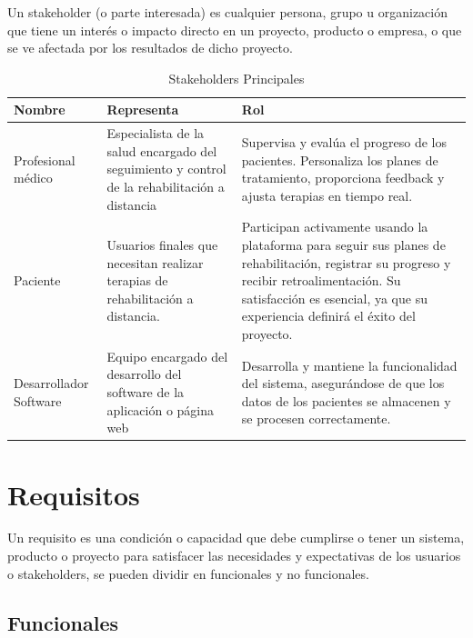 \documentclass{article}
\begin{document}
	Un stakeholder (o parte interesada) es cualquier persona, grupo u organización que tiene un interés o impacto directo en un proyecto, producto o empresa, o que se ve afectada por los resultados de dicho proyecto. 
	
	\begin{table}[ht]
		\centering
		\caption{Stakeholders Principales}
		\begin{tabular}{@{} p{3cm} p{6cm} p{7cm} @{}}
			\toprule
			\textbf{Nombre} & \textbf{Representa} & \textbf{Rol} \\
			\midrule
			Profesional médico & 
			Especialista de la salud encargado del seguimiento y control de la rehabilitación a distancia & 
			Supervisa y evalúa el progreso de los pacientes. \newline Personaliza los planes de tratamiento, proporciona feedback y ajusta terapias en tiempo real. \\
			
			\addlinespace
			
			Paciente & 
			Usuarios finales que necesitan realizar terapias de rehabilitación a distancia. & 
			Participan activamente usando la plataforma para seguir sus planes de rehabilitación, registrar su progreso y recibir retroalimentación. Su satisfacción es esencial, ya que su experiencia definirá el éxito del proyecto. \\
			
			\addlinespace
			
			Desarrollador  Software & 
			Equipo encargado del desarrollo del software de la aplicación o página web & 
			Desarrolla y mantiene la funcionalidad del sistema, asegurándose de que los datos de los pacientes se almacenen y se procesen correctamente. \\
			\bottomrule
		\end{tabular}
	\end{table}
	
	

	
	
	\section{Requisitos}
	
	Un requisito es una condición o capacidad que debe cumplirse o tener un sistema, producto o proyecto para satisfacer las necesidades y expectativas de los usuarios o stakeholders, se pueden dividir en funcionales y no funcionales.
	
	\subsection{Funcionales}
	
\end{document}
